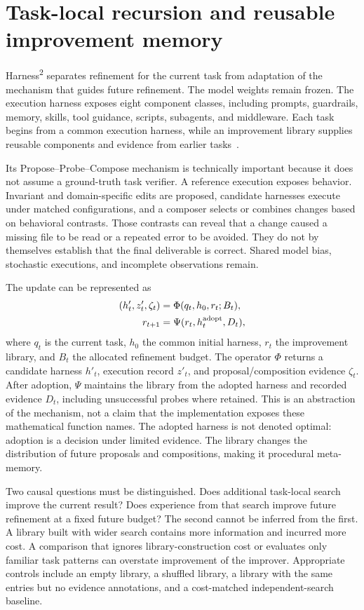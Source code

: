 \section{Task-local recursion and reusable improvement memory}\label{sec:C30:03}
Harness\textsuperscript{2} separates refinement for the current task from adaptation of the mechanism that guides future refinement. The model weights remain frozen. The execution harness exposes eight component classes, including prompts, guardrails, memory, skills, tool guidance, scripts, subagents, and middleware. Each task begins from a common execution harness, while an improvement library supplies reusable components and evidence from earlier tasks~\cite{corpus261014224}.

Its Propose--Probe--Compose mechanism is technically important because it does not assume a ground-truth task verifier. A reference execution exposes behavior. Invariant and domain-specific edits are proposed, candidate harnesses execute under matched configurations, and a composer selects or combines changes based on behavioral contrasts. Those contrasts can reveal that a change caused a missing file to be read or a repeated error to be avoided. They do not by themselves establish that the final deliverable is correct. Shared model bias, stochastic executions, and incomplete observations remain.

The update can be represented as
\begin{align}
 (h'_t,z'_t,\zeta_t)&=\Phi(q_t,h_0,r_t;B_t),\\
 r_{t+1}&=\Psi(r_t,h_t^{\rm adopt},D_t),
\end{align}
where $q_t$ is the current task, $h_0$ the common initial harness, $r_t$ the improvement library, and $B_t$ the allocated refinement budget. The operator $\Phi$ returns a candidate harness $h'_t$, execution record $z'_t$, and proposal/composition evidence $\zeta_t$. After adoption, $\Psi$ maintains the library from the adopted harness and recorded evidence $D_t$, including unsuccessful probes where retained. This is an abstraction of the mechanism, not a claim that the implementation exposes these mathematical function names. The adopted harness is not denoted optimal: adoption is a decision under limited evidence. The library changes the distribution of future proposals and compositions, making it procedural meta-memory.

Two causal questions must be distinguished. Does additional task-local search improve the current result? Does experience from that search improve future refinement at a fixed future budget? The second cannot be inferred from the first. A library built with wider search contains more information and incurred more cost. A comparison that ignores library-construction cost or evaluates only familiar task patterns can overstate improvement of the improver. Appropriate controls include an empty library, a shuffled library, a library with the same entries but no evidence annotations, and a cost-matched independent-search baseline.


